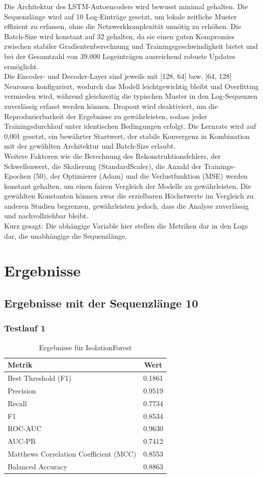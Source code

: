 \documentclass[a4paper,12pt]{article}
\begin{document}
	Die Architektur des LSTM-Autoencoders wird bewusst minimal gehalten. Die Sequenzlänge wird auf 10 Log-Einträge gesetzt, um lokale zeitliche Muster effizient zu erfassen, ohne die Netzwerkkomplexität unnötig zu erhöhen. Die Batch-Size wird konstant auf 32 gehalten, da sie einen guten Kompromiss zwischen stabiler Gradientenberechnung und Trainingsgeschwindigkeit bietet und bei der Gesamtzahl von 39.000 Logeinträgen ausreichend robuste Updates ermöglicht.
	\\[0.5em]
	Die Encoder- und Decoder-Layer sind jeweils mit [128, 64] bzw. [64, 128] Neuronen konfiguriert, wodurch das Modell leichtgewichtig bleibt und Overfitting vermieden wird, während gleichzeitig die typischen Muster in den Log-Sequenzen zuverlässig erfasst werden können. Dropout wird deaktiviert, um die Reproduzierbarkeit der Ergebnisse zu gewährleisten, sodass jeder Trainingsdurchlauf unter identischen Bedingungen erfolgt. Die Lernrate wird auf 0,001 gesetzt, ein bewährter Startwert, der stabile Konvergenz in Kombination mit der gewählten Architektur und Batch-Size erlaubt.
	\\[0.5em]
	Weitere Faktoren wie die Berechnung des Rekonstruktionsfehlers, der Schwellenwert, die Skalierung (StandardScaler), die Anzahl der Trainings-Epochen (50), der Optimierer (Adam) und die Verlustfunktion (MSE) werden konstant gehalten, um einen fairen Vergleich der Modelle zu gewährleisten. Die gewählten Konstanten können zwar die erzielbaren Höchstwerte im Vergleich zu anderen Studien begrenzen, gewährleisten jedoch, dass die Analyse zuverlässig und nachvollziehbar bleibt.
	\\[0.5em]
	Kurz gesagt: Die abhängige Variable hier stellen die Metriken dar in den Logs dar, die unabhängige die Sequenzlänge.
	
	\section{Ergebnisse}
	\subsection{Ergebnisse mit der Sequenzlänge 10}
	\subsubsection{Testlauf 1}
	\begin{table}[H]
		\centering
		\begin{tabular}{lc}
			\hline
			Metrik & Wert \\
			\hline
			Best Threshold (F1) & 0.1861 \\
			Precision & 0.9519 \\
			Recall & 0.7734 \\
			F1 & 0.8534 \\
			ROC-AUC & 0.9630 \\
			AUC-PR & 0.7412 \\
			Matthews Correlation Coefficient (MCC) & 0.8553 \\
			Balanced Accuracy & 0.8863 \\
			\hline
		\end{tabular}
		\caption{Ergebnisse für IsolationForest}
	\end{table}
	
\end{document}
